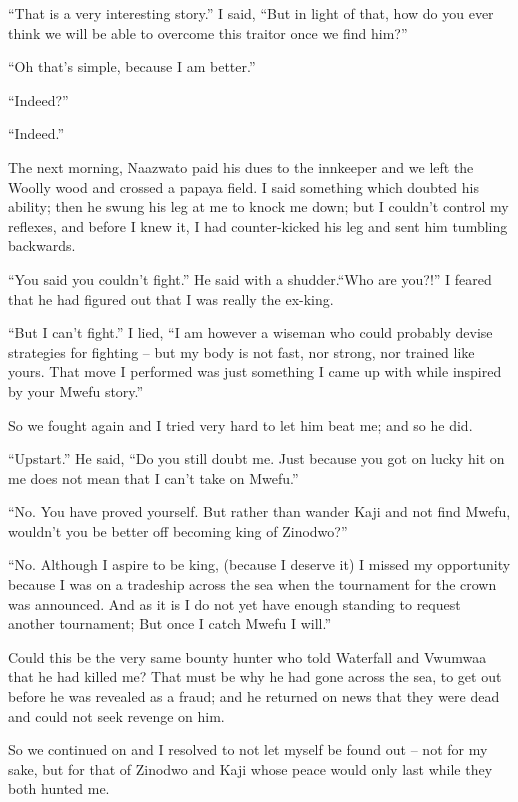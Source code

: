 ``That is a very interesting story.'' I said, ``But in light of that, how do you ever think we will be able to overcome this traitor once we find him?''

``Oh that's simple, because I am better.''

``Indeed?''

``Indeed.''

\tbreak

The next morning, Naa\-zwa\-to paid his dues to the innkeeper and we left the Woolly wood and crossed a papaya field. I said something which doubted his ability; then he swung his leg at me to knock me down; but I couldn't control my reflexes, and before I knew it, I had counter-kicked his leg and sent him tumbling backwards.

``You said you couldn't fight.'' He said with a shudder.``Who are you?!'' I feared that he had figured out that I was really the ex-king.

``But I can't fight.'' I lied, ``I am however a wiseman who could probably devise strategies for fighting -- but my body is not fast, nor strong, nor trained like yours. That move I performed was just something I came up with while inspired by your Mwe\-fu story.''

So we fought again and I tried very hard to let him beat me; and so he did.

``Upstart.'' He said, ``Do you still doubt me. Just because you got on lucky hit on me does not mean that I can't take on Mwe\-fu.''

``No. You have proved yourself. But rather than wander Ka\-ji and not find Mwe\-fu, wouldn't you be better off becoming king of Zi\-no\-dwo?''

``No. Although I aspire to be king, (because I deserve it) I missed my opportunity because I was on a tradeship across the sea when the tournament for the crown was announced. And as it is I do not yet have enough standing to request another tournament; But once I catch Mwe\-fu I will.''

Could this be the very same bounty hunter who told Waterfall and Vwu\-mwaa that he had killed me? That must be why he had gone across the sea, to get out before he was revealed as a fraud; and he returned on news that they were dead and could not seek revenge on him.

So we continued on and I resolved to not let myself be found out -- not for my sake, but for that of Zi\-no\-dwo and Ka\-ji whose peace would only last while they both hunted me.
